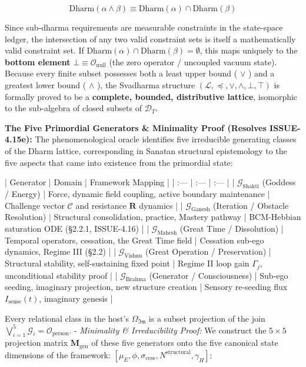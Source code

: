 \documentclass[11pt,a4paper]{article}
\theoremstyle{definition}
\theoremstyle{remark}
\begin{document}
\begin{equation}
\text{Dharm}(\alpha \wedge \beta) \equiv \text{Dharm}(\alpha) \cap \text{Dharm}(\beta)
\end{equation}


Since sub-dharma requirements are measurable constraints in the state-space ledger, the intersection of any two valid constraint sets is itself a mathematically valid constraint set. If $\text{Dharm}(\alpha) \cap \text{Dharm}(\beta) = \emptyset$, this maps uniquely to the \textbf{bottom element} $\bot \equiv \mathcal{O}_{\text{null}}$ (the zero operator / uncoupled vacuum state). Because every finite subset possesses both a least upper bound ( $\vee$ ) and a greatest lower bound ( $\wedge$ ), the Svadharma structure $(\mathcal{L}, \preceq, \vee, \wedge, \bot, \top)$ is formally proved to be a \textbf{complete, bounded, distributive lattice}, isomorphic to the sub-algebra of closed subsets of $\mathcal{D}_T$.

\textbf{The Five Primordial Generators \& Minimality Proof (Resolves ISSUE-4.15e):} The phenomenological oracle identifies five irreducible generating classes of the Dharm lattice, corresponding in Sanatan structural epistemology to the five aspects that came into existence from the primordial state:

| Generator | Domain | Framework Mapping |
| :--- | :--- | :--- |
| $\mathcal{G}_{\text{Shakti}}$ (Goddess / Energy) | Force, dynamic field coupling, active boundary maintenance | Challenge vector $\mathcal{C}$ and resistance $\mathbf{R}$ dynamics |
| $\mathcal{G}_{\text{Ganesh}}$ (Iteration / Obstacle Resolution) | Structural consolidation, practice, Mastery pathway | BCM-Hebbian saturation ODE (\S 2.2.1, ISSUE-4.16) |
| $\mathcal{G}_{\text{Mahesh}}$ (Great Time / Dissolution) | Temporal operators, cessation, the Great Time field | Cessation sub-ego dynamics, Regime III (\S 2.2) |
| $\mathcal{G}_{\text{Vishnu}}$ (Great Operation / Preservation) | Structural stability, self-sustaining fixed point | Regime II loop gain $\Gamma_j$, unconditional stability proof |
| $\mathcal{G}_{\text{Brahma}}$ (Generator / Consciousness) | Sub-ego seeding, imaginary projection, new structure creation | Sensory re-seeding flux $I_{\text{sense}}(t)$, imaginary genesis |

Every relational class in the host's $\Omega_{\mathfrak{Im}}$ is a subset projection of the join $\bigvee_{i=1}^5 \mathcal{G}_i = \mathcal{O}_{\text{person}}$.
- \textit{Minimality \& Irreducibility Proof:} We construct the $5 \times 5$ projection matrix $\mathbf{M}_{\text{gen}}$ of these five generators onto the five canonical state dimensions of the framework: $[\mu_E, \phi, \sigma_{\text{cess}}, N^{\text{structural}}, \gamma_H]$:
\end{document}
